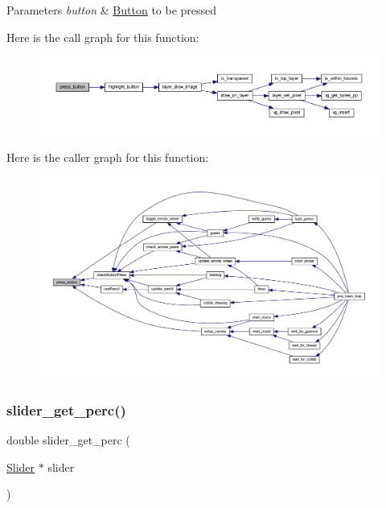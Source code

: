 \begin{DoxyParams}{Parameters}
{\em button} & \mbox{\hyperlink{struct_button}{Button}} to be pressed \\
\hline
\end{DoxyParams}
Here is the call graph for this function\+:\nopagebreak
\begin{figure}[H]
\begin{center}
\leavevmode
\includegraphics[width=350pt]{group__sprite_ga5c42751a94b0c5695a62506fc2011d80_cgraph}
\end{center}
\end{figure}
Here is the caller graph for this function\+:\nopagebreak
\begin{figure}[H]
\begin{center}
\leavevmode
\includegraphics[width=350pt]{group__sprite_ga5c42751a94b0c5695a62506fc2011d80_icgraph}
\end{center}
\end{figure}
\mbox{\label{group__sprite_ga3ac8528c0dc7f14cd06be7fd636fd6d7}} 
\subsubsection{\texorpdfstring{slider\+\_\+get\+\_\+perc()}{slider\_get\_perc()}}
{\footnotesize\ttfamily double slider\+\_\+get\+\_\+perc (\begin{DoxyParamCaption}\item[{\mbox{\hyperlink{struct_slider}{Slider}} $\ast$}]{slider }\end{DoxyParamCaption})}



